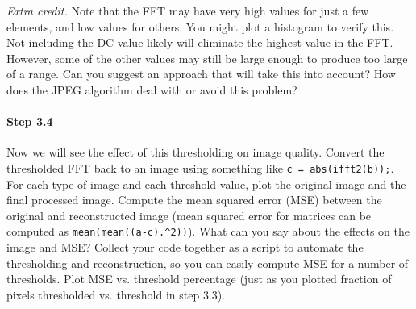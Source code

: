 \textit{Extra credit.} Note that the FFT may have very high values for
just a few elements, and low values for others. You might plot a
histogram to verify this. Not including the DC value likely will
eliminate the highest value in the FFT. However, some of the other
values may still be large enough to produce too large of a range. Can
you suggest an approach that will take this into account? How does the
JPEG algorithm deal with or avoid this problem?

\paragraph{Step 3.4} Now we will see the effect of this thresholding
on image quality. Convert the thresholded FFT back to an image using
something like \verb|c = abs(ifft2(b));|. For each type of image and
each threshold value, plot the original image and the final processed
image. Compute the mean squared error (MSE) between the original and
reconstructed image (mean squared error for matrices can be computed
as \verb|mean(mean((a-c).^2))|).  What can you say about the effects
on the image and MSE?  Collect your code together as a script to
automate the thresholding and reconstruction, so you can easily
compute MSE for a number of thresholds. Plot MSE vs. threshold
percentage (just as you plotted fraction of pixels thresholded
vs. threshold in step 3.3).

